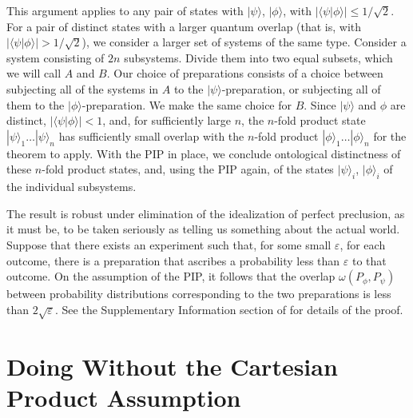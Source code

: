 \documentclass[12pt]{article}
\newcommand{\ket}[1]{|#1\rangle}
\newcommand{\bkt}[2]{\langle#1|#2\rangle}
\begin{document}
This argument applies to any pair of states with $\ket{\psi}$, $\ket{\phi}$, with $|\bkt{\psi}{\phi}| \leq 1/\sqrt{2}$.  For a pair of distinct states with a larger quantum overlap (that is, with $|\bkt{\psi}{\phi}| > 1/\sqrt{2}$),  we  consider a larger set of systems of the same type.  Consider a system consisting of $2n$ subsystems.   Divide them into two equal subsets, which we will call $A$ and $B$. Our choice of preparations consists of a choice between subjecting all of the systems in $A$ to the $\ket{\psi}$-preparation, or subjecting all of them to the $\ket{\phi}$-preparation.  We make the same choice for $B$.
Since $\ket{\psi}$ and $\phi$ are distinct, $|\bkt{\psi}{\phi}| < 1$, and, for sufficiently large $n$, the  $n$-fold product state  $\ket{\psi}_1 \ldots \ket{\psi}_n$ has sufficiently small overlap with the $n$-fold product $\ket{\phi}_1 \ldots \ket{\phi}_n$ for the theorem to apply.  With the PIP in place, we conclude ontological distinctness of these $n$-fold product states, and, using the PIP again, of the states $\ket{\psi}_i$, $\ket{\phi}_i$ of the individual subsystems.

The result is robust under elimination of the idealization of perfect preclusion, as it must be, to be taken seriously as telling us something about the actual world.  Suppose that there exists an experiment such that, for some small $\varepsilon$,  for each outcome, there is a preparation that ascribes a probability less than $\varepsilon$ to that outcome.  On the assumption of the PIP, it follows that the overlap $\omega(P_\phi, P_\psi)$ between probability distributions corresponding to the two preparations is less than $2  \sqrt{\varepsilon}$.  See the Supplementary Information section of  \citet{PBR}  for details of the proof.




\section{Doing Without the Cartesian Product Assumption}\label{thm}
\end{document}
